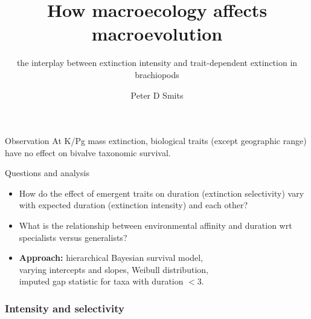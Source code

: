 \documentclass{beamer}
\title{How macroecology affects macroevolution}
\subtitle{the interplay between extinction intensity and trait-dependent extinction in brachiopods}
\author{Peter D Smits}
\institute{Committee on Evolutionary Biology, University of Chicago}
\date{}
\begin{document}
\begin{frame}
  \maketitle
\end{frame}

\begin{frame}
  \begin{alertblock}{Observation}
    At K/Pg mass extinction, biological traits (except geographic range) have no effect on \alert{bivalve} taxonomic survival.

  \end{alertblock}
\end{frame}

\begin{frame}
  \begin{alertblock}{Questions and analysis}
    \begin{itemize}
      \item How do the effect of emergent traits on duration (\alert{extinction selectivity}) vary with expected duration (\alert{extinction intensity}) and each other?
      \item What is the relationship between environmental affinity and duration wrt specialists versus generalists?
      \item \textbf{Approach:} hierarchical Bayesian survival model, \\varying intercepts and slopes, Weibull distribution, \\imputed gap statistic for taxa with duration \(< 3\).
    \end{itemize}
  \end{alertblock}
\end{frame}

\begin{frame}
  \frametitle{Intensity and selectivity}
\end{frame}
\end{document}
